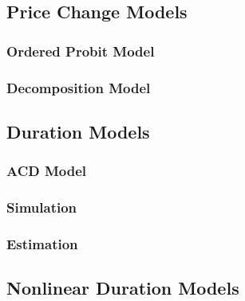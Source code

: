 \subsection{Price Change Models}

\subsubsection{Ordered Probit Model}

\subsubsection{Decomposition Model}

\subsection{Duration Models}

\subsubsection{ACD Model}

\subsubsection{Simulation}

\subsubsection{Estimation}

\subsection{Nonlinear Duration Models}

